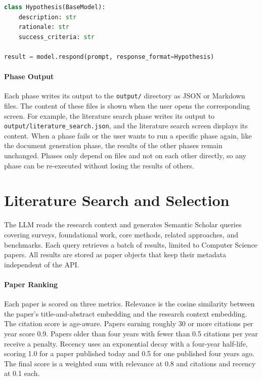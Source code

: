 \begin{lstlisting}[language=Python, caption={[Hypothesis response schema]Response schema definition and enforcement for the hypothesis generation.}, label={lst:hypothesis_model}]
class Hypothesis(BaseModel):
    description: str
    rationale: str
    success_criteria: str

result = model.respond(prompt, response_format=Hypothesis)
\end{lstlisting}

\paragraph{Phase Output}
Each phase writes its output to the \texttt{output/} directory as JSON or Markdown files. 
The content of these files is shown when the user opens the corresponding screen. 
For example, the literature search phase writes its output to \texttt{output/literature_search.json}, and the literature search screen displays its content.
When a phase fails or the user wants to run a specific phase again, like the document generation phase, the results of the other phases remain unchanged.
Phases only depend on files and not on each other directly, so any phase can be re-executed without losing the results of others.



\section{Literature Search and Selection}
The LLM reads the research context and generates Semantic Scholar queries covering surveys, foundational work, core methods, related approaches, and benchmarks.
Each query retrieves a batch of results, limited to Computer Science papers.
All results are stored as paper objects that keep their metadata independent of the API.

\paragraph{Paper Ranking}
Each paper is scored on three metrics.
Relevance is the cosine similarity between the paper's title-and-abstract embedding and the research context embedding.
The citation score is age-aware. Papers earning roughly 30 or more citations per year score 0.9. Papers older than four years with fewer than 0.5 citations per year receive a penalty.
Recency uses an exponential decay with a four-year half-life, scoring 1.0 for a paper published today and 0.5 for one published four years ago.
The final score is a weighted sum with relevance at 0.8 and citations and recency at 0.1 each.

